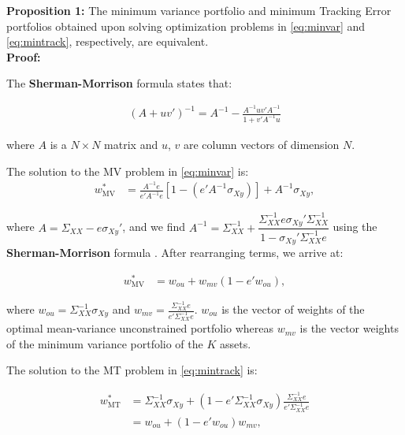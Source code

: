 \documentclass[12pt,oneside,a4paper]{memoir}
\begin{document}
\noindent \textbf{Proposition 1:}
The minimum variance portfolio and minimum Tracking Error portfolios obtained upon solving optimization problems in \eqref{eq:minvar} and \eqref{eq:mintrack}, respectively, are equivalent.\\

\noindent \textbf{Proof:} 

The \textbf{Sherman-Morrison} formula \cite{matcook2012} states that:

\begin{align*}
(A + uv')^{-1} = A^{-1} - \frac{A^{-1}uv'A^{-1}}{1+v'A^{-1}u}
\end{align*}

\noindent
where $A$ is a $N \times N$ matrix and $u$, $v$ are column vectors of dimension $N$.

The solution to the MV problem in \eqref{eq:minvar} is:
\begin{align*}
w^*_{\text{MV}} &= \frac{A^{-1}e}{e'A^{-1}e} [1 - (e'A^{-1}\sigma_{Xy})] + A^{-1}\sigma_{Xy},
\end{align*}

\noindent
where $A = \Sigma_{XX} - e\sigma_{Xy}'$, and we find  
$A^{-1} = \Sigma_{XX}^{-1} +\dfrac{\Sigma_{XX}^{-1}e\sigma_{Xy}'\Sigma_{XX}^{-1}}{1-\sigma_{Xy}'\Sigma_{XX}^{-1}e}$ using the \textbf{Sherman-Morrison} formula \cite{matcook2012}.
After rearranging terms, we arrive at:

\begin{align}\label{eq:minvarsol}
w^*_{\text{MV}} &= w_{ou} + w_{mv}(1-e'w_{ou}),
\end{align}

\noindent
where $w_{ou} = \Sigma_{XX}^{-1}\sigma_{Xy}$ and $w_{mv} = \frac{\Sigma_{XX}^{-1}e}{e'\Sigma_{XX}^{-1}e}$. $w_{ou}$ is the vector of weights of the optimal mean-variance unconstrained portfolio whereas $w_{mv}$ is the vector weights of the minimum variance portfolio of the $K$ assets. 

The solution to the MT problem in \eqref{eq:mintrack} is:

\begin{align}
w^*_{\text{MT}} &= \Sigma_{XX}^{-1} \sigma_{Xy}
+ (1 - e'\Sigma_{XX}^{-1} \sigma_{Xy})
\frac{\Sigma_{XX}^{-1}e}{e'\Sigma_{XX}^{-1}e}
\\
&= w_{ou} + (1 - e'w_{ou})w_{mv},
\end{align}
\end{document}
